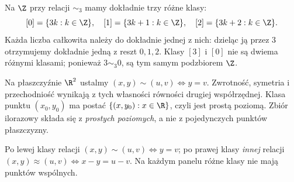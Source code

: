 \begin{przyklad}
Na $\Z$ przy relacji $\sim_3$ mamy dokładnie trzy różne klasy:
\[
 [0]=\{3k:k\in\Z\},\quad
 [1]=\{3k+1:k\in\Z\},\quad
 [2]=\{3k+2:k\in\Z\}.
\]
Każda liczba całkowita należy do dokładnie jednej z nich:
dzieląc ją przez $3$ otrzymujemy dokładnie jedną z reszt
$0,1,2$. Klasy $[3]$ i $[0]$ nie są dwiema różnymi klasami;
ponieważ $3\sim_3 0$, są tym samym podzbiorem $\Z$.
\end{przyklad}

\begin{przyklad}
Na płaszczyźnie $\R^2$ ustalmy
$(x,y)\sim(u,v)\iff y=v$. Zwrotność, symetria i
przechodniość wynikają z tych własności równości drugiej
współrzędnej. Klasa punktu $(x_0,y_0)$ ma postać
$\{(x,y_0):x\in\R\}$, czyli jest prostą poziomą.
Zbiór ilorazowy składa się z \emph{prostych poziomych},
a nie z pojedynczych punktów płaszczyzny.
\end{przyklad}

\begin{center}

{\small Po lewej klasy relacji $(x,y)\sim(u,v)\iff y=v$;
po prawej klasy \emph{innej} relacji
$(x,y)\approx(u,v)\iff x-y=u-v$.
Na każdym panelu różne klasy nie mają punktów wspólnych.}
\end{center}


